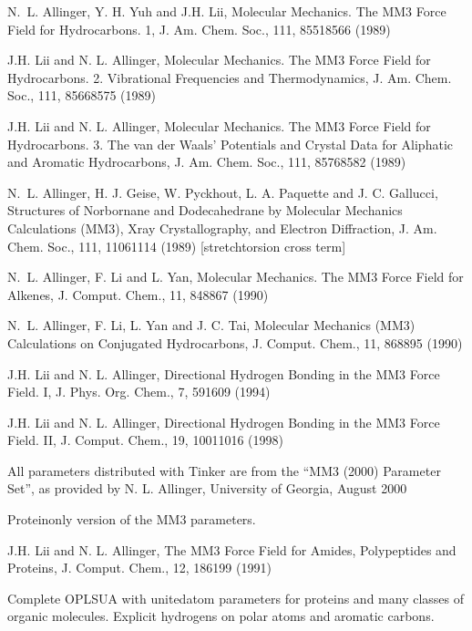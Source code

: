 \documentclass[letterpaper,11pt,english]{sphinxmanual}
\begin{document}
N. L. Allinger, Y. H. Yuh and J.\sphinxhyphen{}H. Lii, Molecular Mechanics. The MM3 Force Field for Hydrocarbons. 1, J. Am. Chem. Soc., 111, 8551\sphinxhyphen{}8566 (1989)

J.\sphinxhyphen{}H. Lii and N. L. Allinger, Molecular Mechanics. The MM3 Force Field for Hydrocarbons. 2. Vibrational Frequencies and Thermodynamics, J. Am. Chem. Soc., 111, 8566\sphinxhyphen{}8575 (1989)

J.\sphinxhyphen{}H. Lii and N. L. Allinger, Molecular Mechanics. The MM3 Force Field for Hydrocarbons. 3. The van der Waals’ Potentials and Crystal Data for Aliphatic and Aromatic Hydrocarbons, J. Am. Chem. Soc., 111, 8576\sphinxhyphen{}8582 (1989)

N. L. Allinger, H. J. Geise, W. Pyckhout, L. A. Paquette and J. C. Gallucci, Structures of Norbornane and Dodecahedrane by Molecular Mechanics Calculations (MM3), X\sphinxhyphen{}ray Crystallography, and Electron Diffraction, J. Am. Chem. Soc., 111, 1106\sphinxhyphen{}1114 (1989)  {[}stretch\sphinxhyphen{}torsion cross term{]}

N. L. Allinger, F. Li and L. Yan, Molecular Mechanics. The MM3 Force Field for Alkenes, J. Comput. Chem., 11, 848\sphinxhyphen{}867 (1990)

N. L. Allinger, F. Li, L. Yan and J. C. Tai, Molecular Mechanics (MM3) Calculations on Conjugated Hydrocarbons, J. Comput. Chem., 11, 868\sphinxhyphen{}895 (1990)

J.\sphinxhyphen{}H. Lii and N. L. Allinger, Directional Hydrogen Bonding in the MM3 Force Field. I, J. Phys. Org. Chem., 7, 591\sphinxhyphen{}609 (1994)

J.\sphinxhyphen{}H. Lii and N. L. Allinger, Directional Hydrogen Bonding in the MM3 Force Field. II, J. Comput. Chem., 19, 1001\sphinxhyphen{}1016 (1998)

All parameters distributed with Tinker are from the “MM3 (2000) Parameter Set”, as provided by N. L. Allinger, University of Georgia, August 2000


Protein\sphinxhyphen{}only version of the MM3 parameters.

J.\sphinxhyphen{}H. Lii and N. L. Allinger, The MM3 Force Field for Amides, Polypeptides and Proteins, J. Comput. Chem., 12, 186\sphinxhyphen{}199 (1991)


Complete OPLS\sphinxhyphen{}UA with united\sphinxhyphen{}atom parameters for proteins and many classes of organic molecules. Explicit hydrogens on polar atoms and aromatic carbons.
\end{document}
